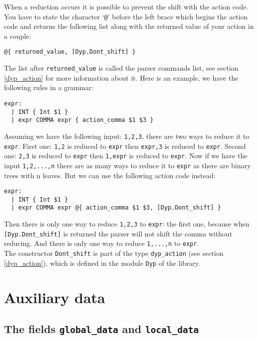 \documentclass[12pt]{article}
\begin{document}
{When a reduction occurs it is possible to prevent the shift with the action code. You have to state the character `\verb|@|' before the left brace which begins the action code and returns the following list along with the returned value of your action in a couple:
\begin{verbatim}
@{ returned_value, [Dyp.Dont_shift] }
\end{verbatim}
The list after \verb|returned_value| is called the parser commands list, see section \ref{dyp_action} for more information about it.
Here is an example, we have the following rules in a grammar:
\begin{verbatim}
expr:
  | INT { Int $1 }
  | expr COMMA expr { action_comma $1 $3 }
\end{verbatim}
Assuming we have the following input: \texttt{1,2,3}, there are two ways to reduce it to \texttt{expr}. First one: \texttt{1,2} is reduced to \texttt{expr} then \texttt{expr,3} is reduced to \texttt{expr}. Second one: \texttt{2,3} is reduced to \texttt{expr} then \texttt{1,expr} is reduced to \texttt{expr}. Now if we have the input \texttt{1,2,...,n} there are as many ways to reduce it to \texttt{expr} as there are binary trees with n leaves. But we can use the following action code instead:
\begin{verbatim}
expr:
  | INT { Int $1 }
  | expr COMMA expr @{ action_comma $1 $3, [Dyp.Dont_shift] }
\end{verbatim}
Then there is only one way to reduce \texttt{1,2,3} to \texttt{expr}: the first one, because when \verb|[Dyp.Dont_shift]| is returned the parser will not shift the comma without reducing. And there is only one way to reduce \verb|1,...,n| to \verb|expr|.\\

The constructor \verb|Dont_shift| is part of the type \verb|dyp_action| (see section \ref{dyp_action}), which is defined in the module \verb|Dyp| of the library.

\section{Auxiliary data}\label{data}

\subsection{The fields \texttt{global\_data} and \texttt{local\_data}}

}
\end{document}
